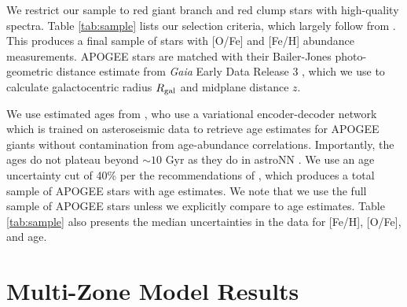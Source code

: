 \documentclass[twocolumn,twocolappendix,linenumbers]{aastex631}
\begin{document}
We restrict our sample to red giant branch and red clump stars with high-quality spectra. Table \ref{tab:sample} lists our selection criteria, which largely follow from \citet{Hayden2015-ChemicalCartography}. This produces a final sample of stars with [O/Fe] and [Fe/H] abundance measurements. APOGEE stars are matched with their Bailer-Jones photo-geometric distance estimate from \textit{Gaia} Early Data Release 3 \citep{gaia_collaboration_gaia_2016,gaia_collaboration_gaia_2021}, which we use to calculate galactocentric radius $R_{\rm gal}$ and midplane distance $z$.

We use estimated ages from \citet[][hereafter ]{leung_variational_2023}, who use a variational encoder-decoder network which is trained on asteroseismic data to retrieve age estimates for APOGEE giants without contamination from age-abundance correlations. Importantly, the  ages do not plateau beyond $\sim10$ Gyr as they do in astroNN \citep{Mackereth2019-astroNN-Ages}. We use an age uncertainty cut of 40\% per the recommendations of , which produces a total sample of APOGEE stars with age estimates. We note that we use the full sample of APOGEE stars unless we explicitly compare to age estimates. Table \ref{tab:sample} also presents the median uncertainties in the data for [Fe/H], [O/Fe], and age.

\section{Multi-Zone Model Results}
\label{sec:multizone-results}
\end{document}
